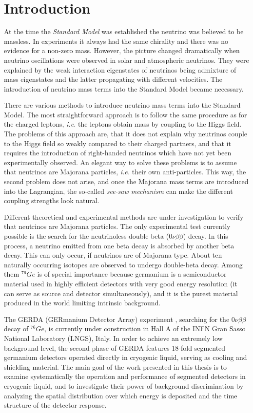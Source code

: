 \chapter{Introduction}
\label{cha:intro}
At the time the \emph{Standard Model} was established the neutrino was believed to be massless. In experiments it always had the same chirality and there was no evidence for a non-zero mass. However, the picture changed dramatically when neutrino oscillations were observed in solar and atmospheric neutrinos. They were explained by the weak interaction eigenstates of neutrinos being admixture of mass eigenstates and the latter propagating with different velocities. The introduction of neutrino mass terms into the Standard Model became necessary.

There are various methods to introduce neutrino mass terms into the Standard Model. The most straightforward approach is to follow the same procedure as for the charged leptons, \textit{i.e.} the leptons obtain mass by coupling to the Higgs field. The problems of this approach are, that it does not explain why neutrinos couple to the Higgs field so weakly compared to their charged partners, and that it requires the introduction of right-handed neutrinos which have not yet been experimentally observed. An elegant way to solve these problems is to assume that neutrinos are Majorana particles, \textit{i.e.} their own anti-particles. This way, the second problem does not arise, and once the Majorana mass terms are introduced into the Lagrangian, the so-called \emph{see-saw mechanism} can make the different coupling strengths look natural.

Different theoretical and experimental methods are under investigation to verify that neutrinos are Majorana particles. The only experimental test currently possible is the search for the neutrinoless double beta ($0\nu\beta\beta$) decay. In this process, a neutrino emitted from one beta decay is absorbed by another beta decay. This can only occur, if neutrinos are of Majorana type. About ten naturally occurring isotopes are observed to undergo double-beta decay. Among them $^{76}Ge$ is of special importance because germanium is a semiconductor material used in highly efficient detectors with very good energy resolution (it can serve as source and detector simultaneously), and it is the purest material produced in the world limiting intrinsic background.

The GERDA (GERmanium Detector Array) experiment \cite{Abt04, Sch05}, searching for the $0\nu\beta\beta$ decay of $^{76}Ge$, is currently under construction in Hall A of the INFN Gran Sasso National Laboratory (LNGS), Italy. In order to achieve an extremely low background level, the second phase of GERDA features 18-fold segmented germanium detectors operated directly in cryogenic liquid, serving as cooling and shielding material. The main goal of the work presented in this thesis is to examine systematically the operation and performance of segmented detectors in cryogenic liquid, and to investigate their power of background discrimination by analyzing the spatial distribution over which energy is deposited and the time structure of the detector response.

